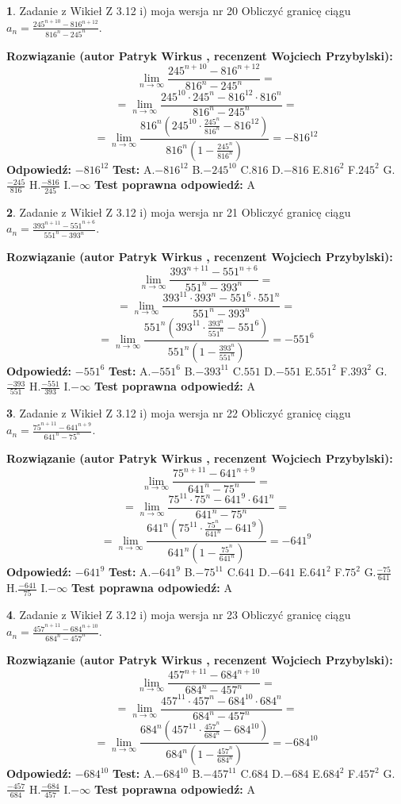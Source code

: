 \documentclass[12pt, a4paper]{article}
\theoremstyle{definition} %
\newtheorem{zad}{}
\newcommand{\zadStart}[1]{\begin{zad}#1\newline}
\newcommand{\zadStop}{\end{zad}}
\newcommand{\rozwStart}[2]{\noindent \textbf{Rozwiązanie (autor #1 , recenzent #2): }\newline}
\newcommand{\rozwStop}{\newline}
\newcommand{\odpStart}{\noindent \textbf{Odpowiedź:}\newline}
\newcommand{\odpStop}{\newline}
\newcommand{\testStart}{\noindent \textbf{Test:}\newline}
\newcommand{\testStop}{\newline}
\newcommand{\kluczStart}{\noindent \textbf{Test poprawna odpowiedź:}\newline}
\newcommand{\kluczStop}{\newline}
\begin{document}
\zadStart{Zadanie z Wikieł Z 3.12 i) moja wersja nr 20}
Obliczyć granicę ciągu $a_{n}=\frac{245^{n+10} - 816^{n+12}}{816^{n}-245^{n}}$.
\zadStop
\rozwStart{Patryk Wirkus}{Wojciech Przybylski}
$$\lim\limits_{n\to\infty}\frac{245^{n+10} - 816^{n+12}}{816^{n}-245^{n}}=$$
$$= \lim\limits_{n\to\infty}\frac{245^{10} \cdot 245^{n} - 816^{12} \cdot 816^{n}}{816^{n}-245^{n}}=$$
$$= \lim\limits_{n\to\infty}\frac{816^{n}(245^{10} \cdot \frac{245^{n}}{816^{n}} - 816^{12})}{816^{n}(1-\frac{245^{n}}{816^{n}})} = -816^{12}$$
\rozwStop
\odpStart
$-816^{12}$
\odpStop
\testStart
A.$-816^{12}$
B.$-245^{10}$
C.$816$
D.$-816$
E.$816^{2}$
F.$245^{2}$
G.$\frac{-245}{816}$
H.$\frac{-816}{245}$
I.$-\infty$
\testStop
\kluczStart
A
\kluczStop



\zadStart{Zadanie z Wikieł Z 3.12 i) moja wersja nr 21}
Obliczyć granicę ciągu $a_{n}=\frac{393^{n+11} - 551^{n+6}}{551^{n}-393^{n}}$.
\zadStop
\rozwStart{Patryk Wirkus}{Wojciech Przybylski}
$$\lim\limits_{n\to\infty}\frac{393^{n+11} - 551^{n+6}}{551^{n}-393^{n}}=$$
$$= \lim\limits_{n\to\infty}\frac{393^{11} \cdot 393^{n} - 551^{6} \cdot 551^{n}}{551^{n}-393^{n}}=$$
$$= \lim\limits_{n\to\infty}\frac{551^{n}(393^{11} \cdot \frac{393^{n}}{551^{n}} - 551^{6})}{551^{n}(1-\frac{393^{n}}{551^{n}})} = -551^{6}$$
\rozwStop
\odpStart
$-551^{6}$
\odpStop
\testStart
A.$-551^{6}$
B.$-393^{11}$
C.$551$
D.$-551$
E.$551^{2}$
F.$393^{2}$
G.$\frac{-393}{551}$
H.$\frac{-551}{393}$
I.$-\infty$
\testStop
\kluczStart
A
\kluczStop



\zadStart{Zadanie z Wikieł Z 3.12 i) moja wersja nr 22}
Obliczyć granicę ciągu $a_{n}=\frac{75^{n+11} - 641^{n+9}}{641^{n}-75^{n}}$.
\zadStop
\rozwStart{Patryk Wirkus}{Wojciech Przybylski}
$$\lim\limits_{n\to\infty}\frac{75^{n+11} - 641^{n+9}}{641^{n}-75^{n}}=$$
$$= \lim\limits_{n\to\infty}\frac{75^{11} \cdot 75^{n} - 641^{9} \cdot 641^{n}}{641^{n}-75^{n}}=$$
$$= \lim\limits_{n\to\infty}\frac{641^{n}(75^{11} \cdot \frac{75^{n}}{641^{n}} - 641^{9})}{641^{n}(1-\frac{75^{n}}{641^{n}})} = -641^{9}$$
\rozwStop
\odpStart
$-641^{9}$
\odpStop
\testStart
A.$-641^{9}$
B.$-75^{11}$
C.$641$
D.$-641$
E.$641^{2}$
F.$75^{2}$
G.$\frac{-75}{641}$
H.$\frac{-641}{75}$
I.$-\infty$
\testStop
\kluczStart
A
\kluczStop



\zadStart{Zadanie z Wikieł Z 3.12 i) moja wersja nr 23}
Obliczyć granicę ciągu $a_{n}=\frac{457^{n+11} - 684^{n+10}}{684^{n}-457^{n}}$.
\zadStop
\rozwStart{Patryk Wirkus}{Wojciech Przybylski}
$$\lim\limits_{n\to\infty}\frac{457^{n+11} - 684^{n+10}}{684^{n}-457^{n}}=$$
$$= \lim\limits_{n\to\infty}\frac{457^{11} \cdot 457^{n} - 684^{10} \cdot 684^{n}}{684^{n}-457^{n}}=$$
$$= \lim\limits_{n\to\infty}\frac{684^{n}(457^{11} \cdot \frac{457^{n}}{684^{n}} - 684^{10})}{684^{n}(1-\frac{457^{n}}{684^{n}})} = -684^{10}$$
\rozwStop
\odpStart
$-684^{10}$
\odpStop
\testStart
A.$-684^{10}$
B.$-457^{11}$
C.$684$
D.$-684$
E.$684^{2}$
F.$457^{2}$
G.$\frac{-457}{684}$
H.$\frac{-684}{457}$
I.$-\infty$
\testStop
\kluczStart
A
\kluczStop
\end{document}

